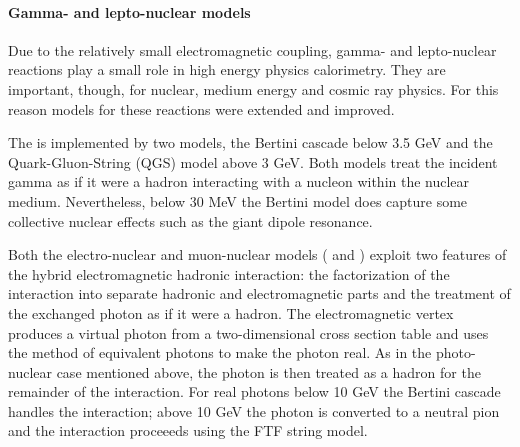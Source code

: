 \paragraph{Gamma- and lepto-nuclear models}
Due to the relatively small electromagnetic coupling, gamma- and lepto-nuclear
reactions play a small role in high energy physics calorimetry. They are 
important, though, for nuclear, medium energy and cosmic ray physics.  For this 
reason \Gfour{} models for these reactions were extended and improved.  

The  is implemented by two models, the Bertini 
cascade below 3.5 GeV and the Quark-Gluon-String (QGS) model above 3 GeV.  Both
models treat the incident gamma as if it were a hadron interacting with a 
nucleon within the nuclear medium.  Nevertheless, below 30 MeV the Bertini model
does capture some collective nuclear effects such as the giant dipole resonance.

Both the electro-nuclear and muon-nuclear models
(
and ) exploit two
features of the hybrid electromagnetic hadronic interaction: the factorization
of the interaction into separate hadronic and electromagnetic parts and the 
treatment of the exchanged 
photon as if it were a hadron.  The electromagnetic vertex produces a virtual 
photon from a two-dimensional cross section table and uses the method of 
equivalent photons to make the photon real.  As in the photo-nuclear case 
mentioned above, the photon is then treated as a hadron for the remainder of the
interaction.  For real photons below 10 GeV the Bertini cascade handles the 
interaction;  above 10 GeV the photon is converted to a neutral pion and the 
interaction proceeeds using the FTF string model.

